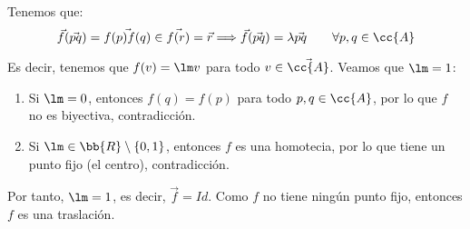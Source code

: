 \begin{ejercicio}
\begin{enumerate}
        Tenemos que:
        \begin{equation*}
            \vec{f}(\vec{pq}) = \vec{f(p)f(q)} \in \vec{f(r)} = \vec{r} \Longrightarrow \vec{f}(\vec{pq}) = \lambda \vec{pq} \qquad \forall p,q\in \cc{A}
        \end{equation*}

        Es decir, tenemos que $f(v)=\lm v$ para todo $v\in \vec{\cc{A}}$. Veamos que $\lm =1$:
        \begin{enumerate}
            \item Si $\lm=0$, entonces $f(q)=f(p)$ para todo $p,q\in \cc{A}$, por lo que $f$ no es biyectiva, contradicción.
            \item Si $\lm \in \bb{R}\setminus \{0,1\}$, entonces $f$ es una homotecia, por lo que tiene un punto fijo (el centro), contradicción.
        \end{enumerate}
        Por tanto, $\lm=1$, es decir, $\vec{f}=Id$. Como $f$ no tiene ningún punto fijo, entonces $f$ es una traslación.
    \end{enumerate}
\end{ejercicio}

